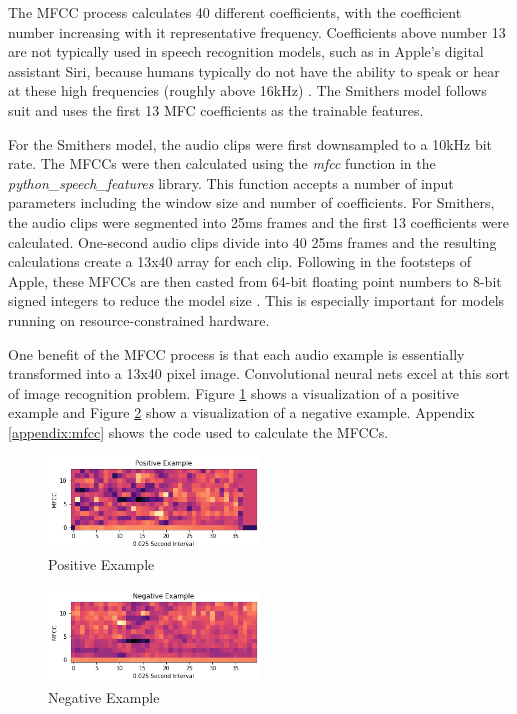 \documentclass[conference]{IEEEtran}
\begin{document}
The MFCC process calculates 40 different coefficients,
with the coefficient number increasing with it representative frequency.
Coefficients above number 13 are not typically used in speech recognition models,
such as in Apple's digital assistant Siri,
because humans typically do not have the ability 
to speak or hear at these high frequencies (roughly above 16kHz) \cite{Efficient}.
The Smithers model follows suit and uses the first 13 MFC coefficients as the trainable features.

For the Smithers model, the audio clips were first downsampled to a 10kHz bit rate.
The MFCCs were then calculated using the \textit{mfcc} function 
in the \textit{python\_speech\_features} library.
This function accepts a number of input parameters including the window size and number of coefficients.
For Smithers, the audio clips were segmented into 25ms frames and the first 13 coefficients were calculated.
One-second audio clips divide into 40 25ms frames and the resulting calculations create a 13x40 array for each clip.
Following in the footsteps of Apple,
these MFCCs are then casted from 64-bit floating point numbers 
to 8-bit signed integers to reduce the model size \cite{Efficient}.
This is especially important for models running on resource-constrained hardware.

One benefit of the MFCC process is that each audio example is essentially transformed into a 13x40 pixel image.
Convolutional neural nets excel at this sort of image recognition problem. 
Figure \ref{fig:pos} shows a visualization of a positive example 
and Figure \ref{fig:neg} show a visualization of a negative example.
Appendix \ref{appendix:mfcc} shows the code used to calculate the MFCCs.


\begin{figure}[htbp]
    \centerline{\includegraphics[width=0.5\textwidth]{figs/positive.png}}
    \caption{Positive Example}
    \label{fig:pos}
\end{figure}

\begin{figure}[htbp]
    \centerline{\includegraphics[width=0.5\textwidth]{figs/negative.png}}
    \caption{Negative Example}
    \label{fig:neg}
\end{figure}
\end{document}
